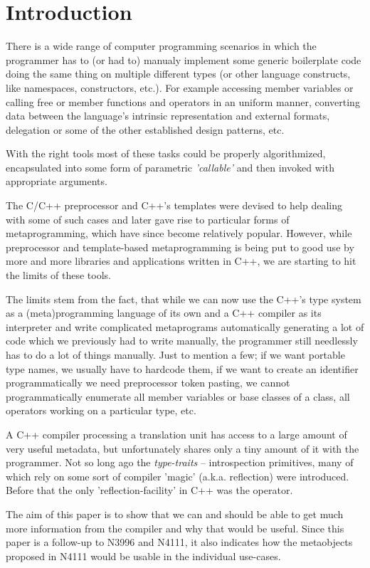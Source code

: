 \section{Introduction}

There is a wide range of computer programming scenarios in which
the programmer has to (or had to) manualy implement some generic boilerplate
code doing the same thing on multiple different types (or other language constructs,
like namespaces, constructors, etc.). For example accessing member variables or
calling free or member functions and operators in an uniform
manner, converting data between the language's intrinsic representation and
external formats, delegation or some of the other
established design patterns, etc.

With the right tools most of these tasks could be properly algorithmized,
encapsulated into some form of parametric {\em 'callable'} and then invoked
with appropriate arguments.

The C/C++ preprocessor and C++'s templates were devised to help dealing
with some of such cases and later gave rise to particular forms of metaprogramming,
which have since become relatively popular. However, while preprocessor and template-based
metaprogramming is being put to good use by more and more libraries and applications written
in C++, we are starting to hit the limits of these tools.

The limits stem from the fact, that while we can now use the C++'s type system
as a (meta)programming language of its own and a C++ compiler as its interpreter
and write complicated metaprograms automatically generating a lot of code
which we previously had to write manually, the programmer still needlessly has to do
a lot of things manually. Just to mention a few; if we want portable type names,
we usually have to hardcode them, if we want to create an identifier programmatically
we need preprocessor token pasting, we cannot programmatically enumerate all member
variables or base classes of a class, all operators working on a particular type, etc.

A C++ compiler processing a translation unit has access to a large amount
of very useful metadata, but unfortunately shares only a tiny amount of it
with the programmer. Not so long ago the {\em type-traits} -- introspection primitives,
many of which rely on some sort of compiler 'magic' (a.k.a. reflection) were introduced.
Before that the only 'reflection-facility' in C++ was the \verb@typeid@ operator.

The aim of this paper is to show that we can and should be able to get much more
information from the compiler and why that would be useful. Since this paper is a follow-up
to N3996 and N4111, it also indicates how the metaobjects proposed in N4111 would
be usable in the individual use-cases.

